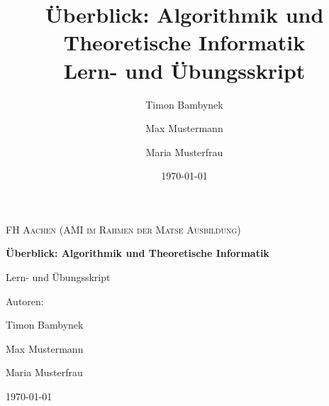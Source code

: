\documentclass[12pt,a4paper]{report}
\title{Überblick: Algorithmik und Theoretische Informatik\\[0.5em]\large Lern- und Übungsskript}
\author{Timon Bambynek \and Max Mustermann \and Maria Musterfrau}
\date{\today}
\begin{document}
\hypersetup{pageanchor=true}%

\begin{titlepage}
  \centering
  {\scshape\LARGE FH Aachen (AMI im Rahmen der Matse Ausbildung)\par}
  \vspace{1.5cm}
  {\huge\bfseries Überblick: Algorithmik und Theoretische Informatik\par}
  \vspace{0.5cm}
  {\Large Lern- und Übungsskript\par}
  \vspace{1.5cm}
  {\Large Autoren:\par}
  \vspace{0.3cm}
  {\large Timon Bambynek\par}
  {\large Max Mustermann\par}
  {\large Maria Musterfrau\par}
  \vfill
  {\large \today\par}
\end{titlepage}

\tableofcontents
\newpage
{}







\end{document}
